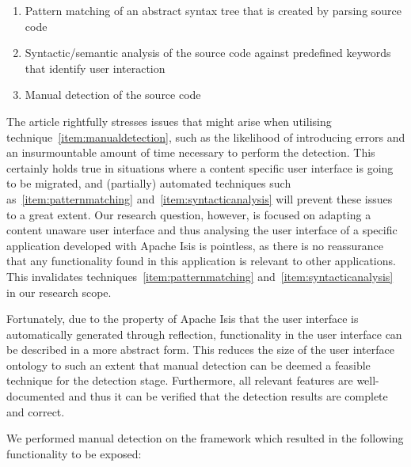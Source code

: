 \begin{enumerate}
	\item \label{item:patternmatching} Pattern matching of an abstract syntax tree that is created by parsing source code
	\item \label{item:syntacticanalysis} Syntactic/semantic analysis of the source code against predefined keywords that identify user interaction 
	\item \label{item:manualdetection} Manual detection of the source code 
\end{enumerate}

The article rightfully stresses issues that might arise when utilising technique~\ref{item:manualdetection}, such as the likelihood of introducing errors and an insurmountable amount of time necessary to perform the detection. This certainly holds true in situations where a content specific user interface is going to be migrated, and (partially) automated techniques such as~\ref{item:patternmatching} and~\ref{item:syntacticanalysis} will prevent these issues to a great extent. Our research question, however, is focused on adapting a content unaware user interface and thus analysing the user interface of a specific application developed with Apache Isis is pointless, as there is no reassurance that any functionality found in this application is relevant to other applications. This invalidates techniques~\ref{item:patternmatching} and~\ref{item:syntacticanalysis} in our research scope.

Fortunately, due to the property of Apache Isis that the user interface is automatically generated through reflection, functionality in the user interface can be described in a more abstract form. This reduces the size of the user interface ontology to such an extent that manual detection can be deemed a feasible technique for the detection stage. Furthermore, all relevant features are well-documented\cite{Docum42:online} and thus it can be verified that the detection results are complete and correct.

We performed manual detection on the framework which resulted in the following functionality to be exposed:

